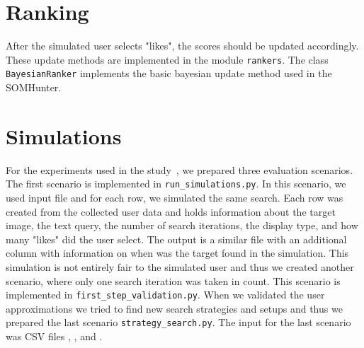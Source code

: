 \section{Ranking}

After the simulated user selects "likes", the scores should be updated accordingly. These update methods are implemented in the module \lstinline{rankers}. The class \lstinline{BayesianRanker} implements the basic bayesian update method used in the SOMHunter.

\section{Simulations}

For the experiments used in the study~\cite{peska2021}, we prepared three evaluation scenarios. The first scenario is implemented in \lstinline{run_simulations.py}. In this scenario, we used input file  and for each row, we simulated the same search. Each row was created from the collected user data and holds information about the target image, the text query,  the number of search iterations, the display type, and how many "likes" did the user select. The output is a similar file with an additional column with information on when was the target found in the simulation. This simulation is not entirely fair to the simulated user and thus we created another scenario, where only one search iteration was taken in count. This scenario is implemented in \lstinline{first_step_validation.py}. When we validated the user approximations we tried to find new search strategies and setups and thus we prepared the last scenario \lstinline{strategy_search.py}. The input for the last scenario was CSV files , , and .


